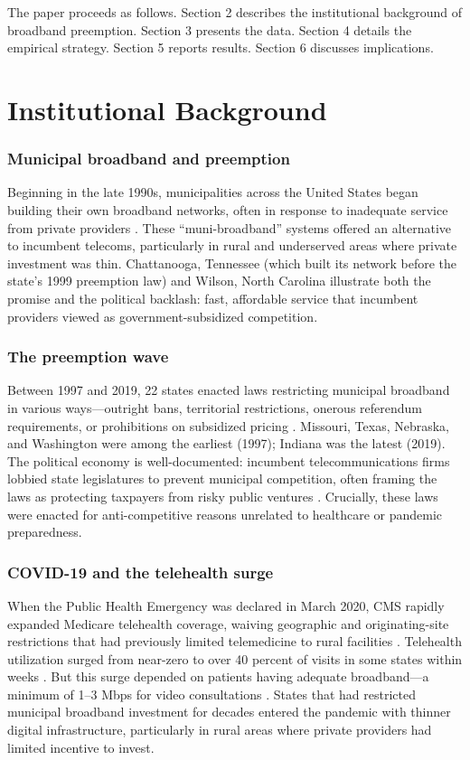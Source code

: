 \documentclass[12pt]{article}
\begin{document}
The paper proceeds as follows. Section 2 describes the institutional background of broadband preemption. Section 3 presents the data. Section 4 details the empirical strategy. Section 5 reports results. Section 6 discusses implications.


\section{Institutional Background}

\subsubsection*{Municipal broadband and preemption} Beginning in the late 1990s, municipalities across the United States began building their own broadband networks, often in response to inadequate service from private providers \citep{gillett2006municipal}. These ``muni-broadband'' systems offered an alternative to incumbent telecoms, particularly in rural and underserved areas where private investment was thin. Chattanooga, Tennessee (which built its network before the state's 1999 preemption law) and Wilson, North Carolina illustrate both the promise and the political backlash: fast, affordable service that incumbent providers viewed as government-subsidized competition.

\subsubsection*{The preemption wave} Between 1997 and 2019, 22 states enacted laws restricting municipal broadband in various ways---outright bans, territorial restrictions, onerous referendum requirements, or prohibitions on subsidized pricing \citep{ilsr2020preemption}. Missouri, Texas, Nebraska, and Washington were among the earliest (1997); Indiana was the latest (2019). The political economy is well-documented: incumbent telecommunications firms lobbied state legislatures to prevent municipal competition, often framing the laws as protecting taxpayers from risky public ventures \citep{beland2020municipal}. Crucially, these laws were enacted for anti-competitive reasons unrelated to healthcare or pandemic preparedness.

\subsubsection*{COVID-19 and the telehealth surge} When the Public Health Emergency was declared in March 2020, CMS rapidly expanded Medicare telehealth coverage, waiving geographic and originating-site restrictions that had previously limited telemedicine to rural facilities \citep{mehrotra2020rapidly}. Telehealth utilization surged from near-zero to over 40 percent of visits in some states within weeks \citep{cms2024telehealth}. But this surge depended on patients having adequate broadband---a minimum of 1--3 Mbps for video consultations \citep{bauerly2019broadband}. States that had restricted municipal broadband investment for decades entered the pandemic with thinner digital infrastructure, particularly in rural areas where private providers had limited incentive to invest.
\end{document}
